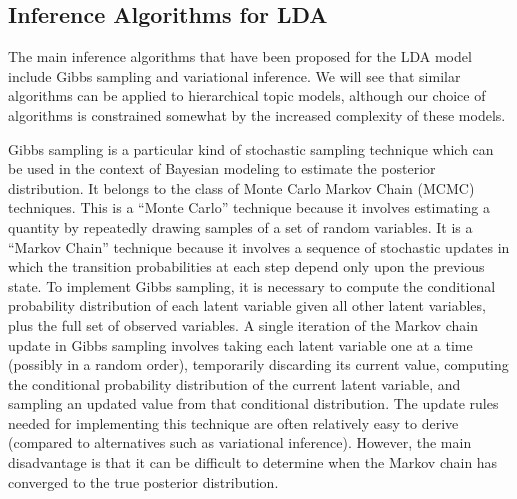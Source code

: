 \documentclass{article}
\begin{document}
\subsection{Inference Algorithms for LDA}

The main inference algorithms that have been proposed for the LDA model include Gibbs sampling and variational inference.
We will see that similar algorithms can be applied to hierarchical topic models, although our choice of algorithms is constrained somewhat by the increased complexity of these models.

Gibbs sampling is a particular kind of stochastic sampling technique which can be used in the context of Bayesian modeling to estimate the posterior distribution.
It belongs to the class of Monte Carlo Markov Chain (MCMC) techniques.
This is a ``Monte Carlo'' technique because it involves estimating a quantity by repeatedly drawing samples of a set of random variables.
It is a ``Markov Chain'' technique because it involves a sequence of stochastic updates in which the transition probabilities at each step depend only upon the previous state.
To implement Gibbs sampling, it is necessary to compute the conditional probability distribution of each latent variable given all other latent variables, plus the full set of observed variables.
A single iteration of the Markov chain update in Gibbs sampling involves taking each latent variable one at a time (possibly in a random order), temporarily discarding its current value, computing the conditional probability distribution of the current latent variable, and sampling an updated value from that conditional distribution.
The update rules needed for implementing this technique are often relatively easy to derive (compared to alternatives such as variational inference).
However, the main disadvantage is that it can be difficult to determine when the Markov chain has converged to the true posterior distribution.
\end{document}

